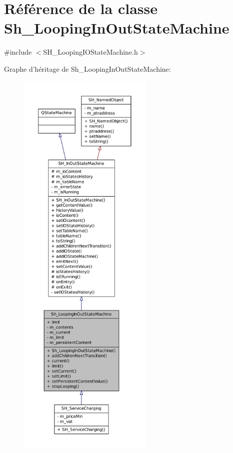 \hypertarget{classSh__LoopingInOutStateMachine}{\section{Référence de la classe Sh\-\_\-\-Looping\-In\-Out\-State\-Machine}
\label{classSh__LoopingInOutStateMachine}
}


{\ttfamily \#include $<$S\-H\-\_\-\-Looping\-I\-O\-State\-Machine.\-h$>$}



Graphe d'héritage de Sh\-\_\-\-Looping\-In\-Out\-State\-Machine\-:
\nopagebreak
\begin{figure}[H]
\begin{center}
\leavevmode
\includegraphics[height=550pt]{classSh__LoopingInOutStateMachine__inherit__graph}
\end{center}
\end{figure}


